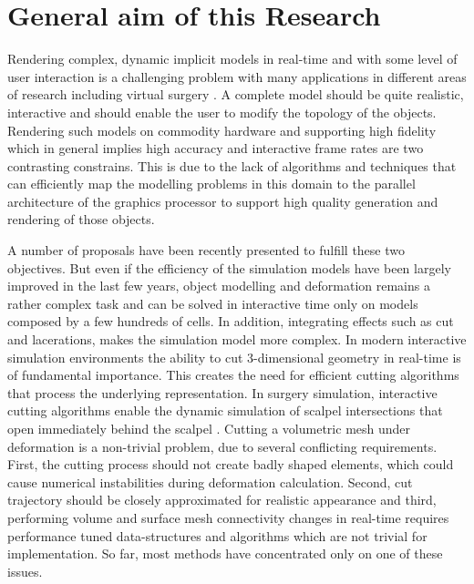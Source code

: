

\label{chapter:introduction}
\section{General aim of this Research}
Rendering complex, dynamic implicit models in real-time and with some level of user interaction is a challenging 
problem with many applications in different areas of research including virtual surgery \cite{France2002a}. 
A complete model should be quite realistic, interactive and should enable the user to modify the topology of the objects.
Rendering such models on commodity hardware and supporting high fidelity which in general implies high 
accuracy and interactive frame rates are two contrasting constrains. This is due 
to the lack of algorithms and techniques that can efficiently map the modelling problems in this domain to the 
parallel architecture of the graphics processor to support high quality generation and rendering of those objects. 

A number of proposals have been recently presented to fulfill these two objectives. But even if the efficiency
of the simulation models have been largely improved in the last few years, object modelling and deformation remains a rather 
complex task and can be solved in interactive time only on models composed by a few hundreds of cells. In addition, integrating effects
such as cut and lacerations, makes the simulation model more complex. In modern interactive simulation environments the ability to 
cut 3-dimensional geometry in real-time is of fundamental importance. This creates the need for efficient cutting algorithms that process the 
underlying representation. In surgery simulation, interactive cutting algorithms enable the dynamic simulation of scalpel intersections that open 
immediately behind the scalpel \cite{Nienhuys2001a}. Cutting a volumetric mesh under deformation is a non-trivial problem, 
due to several conflicting requirements. First, the cutting process should not create badly shaped elements, which could 
cause numerical instabilities during deformation calculation. Second, cut trajectory should be closely approximated 
for realistic appearance and third, performing volume and surface mesh connectivity changes in real-time 
requires performance tuned data-structures and algorithms which are not trivial for implementation. 
So far, most methods have concentrated only on one of these issues. 

